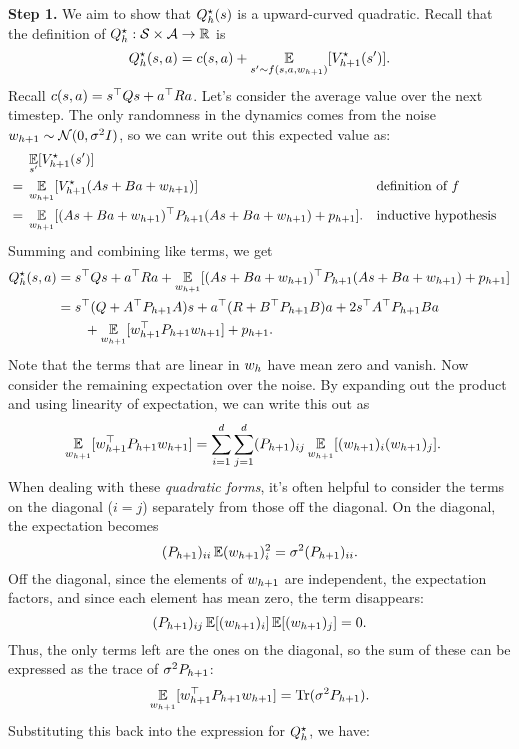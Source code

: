 \documentclass[\main/main]{subfiles}
\begin{document}
\textbf{Step 1.} We aim to show that $Q^\star_h(s)$ is a upward-curved quadratic.
Recall that the definition of $Q^\star_h : \mathcal{S} \times \mathcal{A} \to \mathbb{R}$ is \[
    Q^\star_h(s, a) = c(s, a) + \operatorname*{\mathbb{E}}_{s' \sim f(s, a, w_{h+1})} [V^\star_{h+1}(s')].
\]
Recall $c(s, a) = s^\top Q s + a^\top R a$. Let's consider the average value
over the next timestep. The only randomness in the dynamics comes from the noise
$w_{h+1} \sim \mathcal{N}(0, \sigma^2 I)$, so we can write out this expected value as:
\begin{align*}
            & \operatorname*{\mathbb{E}}_{s'} [V^\star_{h+1}(s')]                                                                                                         \\
    {} = {} & \operatorname*{\mathbb{E}}_{w_{h+1}} [V^\star_{h+1}(A s + B a + w_{h+1})]                                             &  & \text{definition of } f     \\
    {} = {} & \operatorname*{\mathbb{E}}_{w_{h+1}} [ (A s + B a + w_{h+1})^\top P_{h+1} (A s + B a + w_{h+1}) + p_{h+1} ]. &  & \text{inductive hypothesis}
\end{align*}
Summing and combining like terms, we get \begin{align*}
    Q^\star_h(s, a) & = s^\top Q s + a^\top R a + \operatorname*{\mathbb{E}}_{w_{h+1}} [(A s + B a + w_{h+1})^\top P_{h+1} (A s + B a + w_{h+1}) + p_{h+1}] \\
                           & = s^\top (Q + A^\top P_{h+1} A)s + a^\top (R + B^\top P_{h+1} B) a + 2 s^\top A^\top P_{h+1} B a                       \\
                           & \qquad + \operatorname*{\mathbb{E}}_{w_{h+1}} [w_{h+1}^\top P_{h+1} w_{h+1}] + p_{h+1}.
\end{align*}
Note that the terms that are linear in $w_h$ have mean zero and vanish.
Now consider the remaining expectation over the noise. By expanding out the product and using linearity of
expectation, we can write this out as \begin{align*}
    \operatorname*{\mathbb{E}}_{w_{h+1}} [w_{h+1}^\top P_{h+1} w_{h+1}] & = \sum_{i=1}^d \sum_{j=1}^d (P_{h+1})_{ij} \operatorname*{\mathbb{E}}_{w_{h+1}} [(w_{h+1})_i (w_{h+1})_j].
\end{align*}
When dealing with these \emph{quadratic forms}, it's often helpful to consider the terms
on the diagonal ($i = j$) separately from those off the diagonal. On the diagonal, the
expectation becomes \[ (P_{h+1})_{ii} \operatorname*{\mathbb{E}} (w_{h+1})_i^2 = \sigma^2 (P_{h+1})_{ii}. \]
Off the diagonal, since the elements of $w_{h+1}$ are independent,
the expectation factors, and since each element has mean zero, the term disappears: \[ (P_{h+1})_{ij} \operatorname*{\mathbb{E}} [(w_{h+1})_i] \operatorname*{\mathbb{E}} [(w_{h+1})_j] = 0. \]
Thus, the only terms left are the ones on the diagonal, so the sum of these can
be expressed as the trace of $\sigma^2 P_{h+1}$: \[
    \operatorname*{\mathbb{E}}_{w_{h+1}} [w_{h+1}^\top P_{h+1} w_{h+1}] = \operatorname*{\textrm{Tr}}(\sigma^2 P_{h+1}).
\]
Substituting this back into the expression for $Q^\star_h$, we have:
\end{document}
